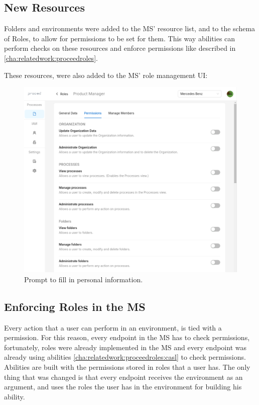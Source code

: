 \subsection{New Resources}

Folders and environments were added to the MS' resource list, and to the schema of
Roles, to allow for permissions to be set for them.
This way abilities can perform checks on these resources and enforce permissions like
described in \ref{cha:relatedwork:proceedroles}.

These resources, were also added to the MS' role management UI:

\begin{figure}[H]
	\centering
	\includegraphics[scale=0.2]{images/role-permissions-view.png}
	\caption{Prompt to fill in personal information.}
	\vspace{-1em} %
	\label{fig:prompt-fill-personal-information}
\end{figure}



\subsection{Enforcing Roles in the MS}

Every action that a user can perform in an environment, is tied with a permission.
For this reason, every endpoint in the MS has to check permissions, fortunately, roles
were already implemented in the MS and every endpoint was already using abilities
\ref{cha:relatedwork:proceedroles:casl} to check permissions.
Abilities are built with the permissions stored in roles that a user has.
The only thing that was changed is that every endpoint receives the environment as an
argument, and uses the roles the user has in the environment for building his ability.

